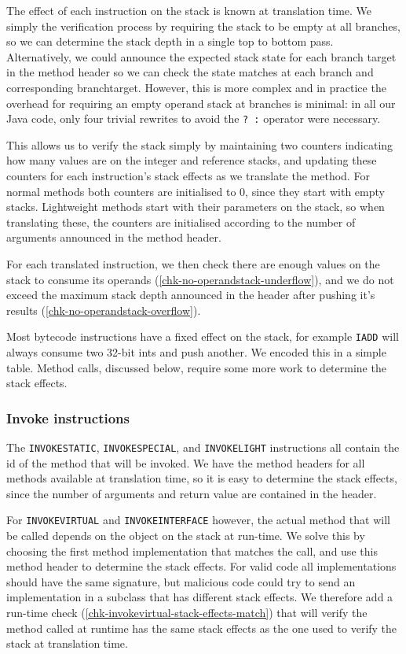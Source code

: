 The effect of each instruction on the stack is known at translation time. We simply the verification process by requiring the stack to be empty at all branches, so we can determine the stack depth in a single top to bottom pass. Alternatively, we could announce the expected stack state for each branch target in the method header so we can check the state matches at each branch and corresponding branchtarget. However, this is more complex and in practice the overhead for requiring an empty operand stack at branches is minimal: in all our Java code, only four trivial rewrites to avoid the \texttt{? :} operator were necessary.

This allows us to verify the stack simply by maintaining two counters indicating how many values are on the integer and reference stacks, and updating these counters for each instruction's stack effects as we translate the method. For normal methods both counters are initialised to 0, since they start with empty stacks. Lightweight methods start with their parameters on the stack, so when translating these, the counters are initialised according to the number of arguments announced in the method header.

For each translated instruction, we then check there are enough values on the stack to consume its operands (\ref{chk-no-operandstack-underflow}), and we do not exceed the maximum stack depth announced in the header after pushing it's results (\ref{chk-no-operandstack-overflow}).

Most bytecode instructions have a fixed effect on the stack, for example \texttt{IADD} will always consume two 32-bit ints and push another. We encoded this in a simple table. Method calls, discussed below, require some more work to determine the stack effects. 

\subsubsection{Invoke instructions}
The \texttt{INVOKESTATIC}, \texttt{INVOKESPECIAL}, and \texttt{INVOKELIGHT} instructions all contain the id of the method that will be invoked. We have the method headers for all methods available at translation time, so it is easy to determine the stack effects, since the number of arguments and return value are contained in the header.

For \texttt{INVOKEVIRTUAL} and \texttt{INVOKEINTERFACE} however, the actual method that will be called depends on the object on the stack at run-time. We solve this by choosing the first method implementation that matches the call, and use this method header to determine the stack effects. For valid code all implementations should have the same signature, but malicious code could try to send an implementation in a subclass that has different stack effects. We therefore add a run-time check (\ref{chk-invokevirtual-stack-effects-match}) that will verify the method called at runtime has the same stack effects as the one used to verify the stack at translation time.

